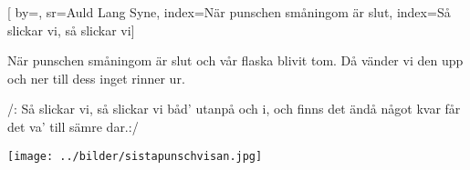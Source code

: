 

[ 		%
	by={},					%
	sr={Auld Lang Syne},					%
	index={När punschen småningom är slut}, %
	index={Så slickar vi, så slickar vi}]						%
	

\beginverse*						%
När punschen småningom är slut
och vår flaska blivit tom.
Då vänder vi den upp och ner
till dess inget rinner ur.
\endverse							%

\beginchorus						%
/: Så slickar vi, så slickar vi
båd' utanpå och i,
och finns det ändå något kvar
får det va' till sämre dar.:/
\endchorus

\endsong							%

\begin{intersong}
 \begin{center}
\texttt{[image: ../bilder/sistapunschvisan.jpg]} 
\end{center}
\end{intersong}